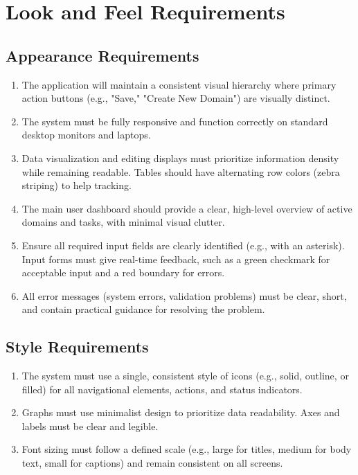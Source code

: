 \documentclass[12pt]{article}
\begin{document}
\section{Look and Feel Requirements}
\subsection{Appearance Requirements}
\begin{enumerate}[label=LF-AR\arabic*]
  \item The application will maintain a consistent visual hierarchy where primary action buttons (e.g., "Save," "Create New Domain") are visually distinct.
  \item The system must be fully responsive and function correctly on standard desktop monitors and laptops.
  \item Data visualization and editing displays must prioritize information density while remaining readable. Tables should have alternating row colors (zebra striping) to help tracking.
  \item The main user dashboard should provide a clear, high-level overview of active domains and tasks, with minimal visual clutter.
  \item Ensure all required input fields are clearly identified (e.g., with an asterisk). Input forms must give real-time feedback, such as a green checkmark for acceptable input and a red boundary for errors.
  \item All error messages (system errors, validation problems) must be clear, short, and contain practical guidance for resolving the problem.
\end{enumerate}
\subsection{Style Requirements}
\begin{enumerate}[label=LF-SR\arabic*]
  \item The system must use a single, consistent style of icons (e.g., solid, outline, or filled) for all navigational elements, actions, and status indicators.
  \item Graphs must use minimalist design to prioritize data readability. Axes and labels must be clear and legible.
  \item Font sizing must follow a defined scale (e.g., large for titles, medium for body text, small for captions) and remain consistent on all screens.
\end{enumerate}
\end{document}
